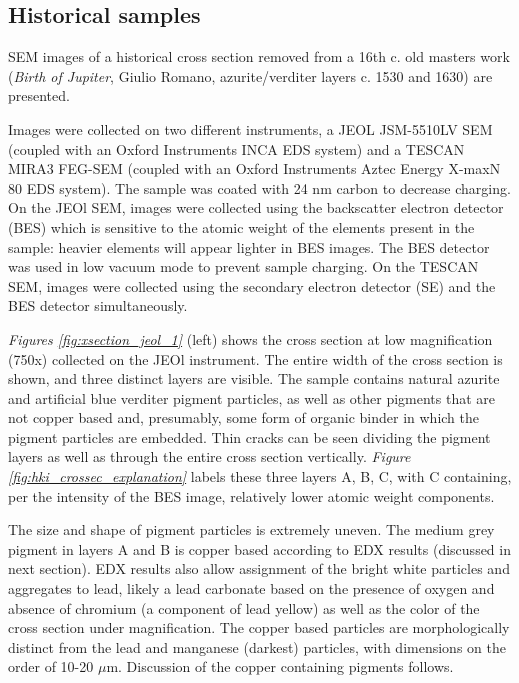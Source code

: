 \subsection[Historical samples]{Historical samples}
\label{subsection3.1.3}

SEM images of a historical cross section removed from a 16th c. old masters work (\textit{Birth of Jupiter}, Giulio Romano, azurite/verditer layers c. 1530 and 1630) are presented.

Images were collected on two different instruments, a JEOL JSM-5510LV SEM (coupled with an Oxford Instruments INCA EDS system) and a TESCAN MIRA3 FEG-SEM (coupled with an Oxford Instruments Aztec Energy X-maxN 80 EDS system). The sample was coated with 24 nm carbon to decrease charging. On the JEOl SEM, images were collected using the backscatter electron detector (BES) which is sensitive to the atomic weight of the elements present in the sample: heavier elements will appear lighter in BES images. The BES detector was used in low vacuum mode to prevent sample charging. On the TESCAN SEM, images were collected using the secondary electron detector (SE) and the BES detector simultaneously. 

\textit{Figures \ref{fig:xsection_jeol_1}} (left) shows the cross section at low magnification (750x) collected on the JEOl instrument. The entire width of the cross section is shown, and three distinct layers are visible. The sample contains natural azurite and artificial blue verditer pigment particles, as well as other pigments that are not copper based and, presumably, some form of organic binder in which the pigment particles are embedded. Thin cracks can be seen dividing the pigment layers as well as through the entire cross section vertically. \textit{Figure \ref{fig:hki_crossec_explanation}} labels these three layers A, B, C, with C containing, per the intensity of the BES image, relatively lower atomic weight components. 

The size and shape of pigment particles is extremely uneven. The medium grey pigment in layers A and B is copper based according to EDX results (discussed in next section). EDX results also allow assignment of the bright white particles and aggregates to lead, likely a lead carbonate based on the presence of oxygen and absence of chromium (a component of lead yellow) as well as the color of the cross section under magnification. The copper based particles are morphologically distinct from the lead and manganese (darkest) particles, with dimensions on the order of 10-20 $\mu$m. Discussion of the copper containing pigments follows.

